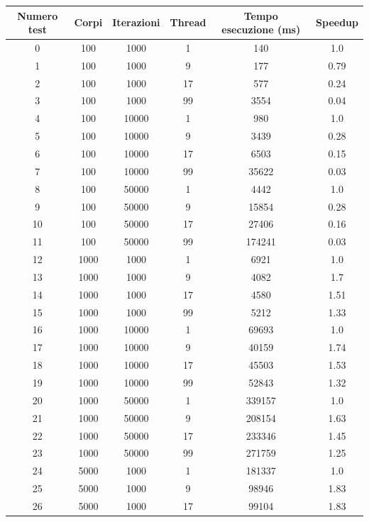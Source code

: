 \documentclass[12pt,a4paper,openright,twoside]{book}
\begin{document}
\begin{table}[h!]
	\centering
	\begin{tabular}{ |c|c|c|c|c|c| } 
		\hline
		Numero test & Corpi & Iterazioni & Thread & Tempo esecuzione (ms) & Speedup \\
		\hline
		0 & 100 & 1000 & 1 & 140 & 1.0 \\ 
 \hline
1 & 100 & 1000 & 9 & 177 & 0.79 \\ 
 \hline
2 & 100 & 1000 & 17 & 577 & 0.24 \\ 
 \hline
3 & 100 & 1000 & 99 & 3554 & 0.04 \\ 
 \hline
4 & 100 & 10000 & 1 & 980 & 1.0 \\ 
 \hline
5 & 100 & 10000 & 9 & 3439 & 0.28 \\ 
 \hline
6 & 100 & 10000 & 17 & 6503 & 0.15 \\ 
 \hline
7 & 100 & 10000 & 99 & 35622 & 0.03 \\ 
 \hline
8 & 100 & 50000 & 1 & 4442 & 1.0 \\ 
 \hline
9 & 100 & 50000 & 9 & 15854 & 0.28 \\ 
 \hline
10 & 100 & 50000 & 17 & 27406 & 0.16 \\ 
 \hline
11 & 100 & 50000 & 99 & 174241 & 0.03 \\ 
 \hline
12 & 1000 & 1000 & 1 & 6921 & 1.0 \\ 
 \hline
13 & 1000 & 1000 & 9 & 4082 & 1.7 \\ 
 \hline
14 & 1000 & 1000 & 17 & 4580 & 1.51 \\ 
 \hline
15 & 1000 & 1000 & 99 & 5212 & 1.33 \\ 
 \hline
16 & 1000 & 10000 & 1 & 69693 & 1.0 \\ 
 \hline
17 & 1000 & 10000 & 9 & 40159 & 1.74 \\ 
 \hline
18 & 1000 & 10000 & 17 & 45503 & 1.53 \\ 
 \hline
19 & 1000 & 10000 & 99 & 52843 & 1.32 \\ 
 \hline
20 & 1000 & 50000 & 1 & 339157 & 1.0 \\ 
 \hline
21 & 1000 & 50000 & 9 & 208154 & 1.63 \\ 
 \hline
22 & 1000 & 50000 & 17 & 233346 & 1.45 \\ 
 \hline
23 & 1000 & 50000 & 99 & 271759 & 1.25 \\ 
 \hline
24 & 5000 & 1000 & 1 & 181337 & 1.0 \\ 
 \hline
25 & 5000 & 1000 & 9 & 98946 & 1.83 \\ 
 \hline
26 & 5000 & 1000 & 17 & 99104 & 1.83 \\ 

\end{tabular}
\end{table}
\end{document}
